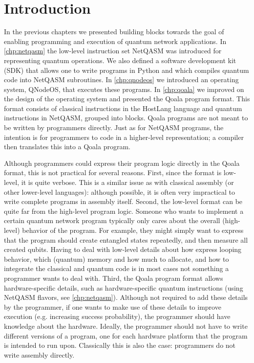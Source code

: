 \section{Introduction}
In the previous chapters we presented building blocks towards the goal of enabling programming and execution of quantum network applications.
In \cref{chp:netqasm} the low-level instruction set NetQASM was introduced for representing quantum operations.
We also defined a software development kit (SDK) that allows one to write programs in Python and which compiles quantum code into NetQASM subroutines.
In \cref{chp:qnodeos} we introduced an operating system, QNodeOS, that executes these programs.
In \cref{chp:qoala} we improved on the design of the operating system and presented the Qoala program format.
This format consists of classical instructions in the HostLang language and quantum instructions in NetQASM, grouped into blocks.
Qoala programs are not meant to be written by programmers directly.
Just as for NetQASM programs, the intention is for programmers to code in a higher-level representation; a compiler then translates this into a Qoala program.

Although programmers could express their program logic directly in the Qoala format, this is not practical for several reasons.
First, since the format is low-level, it is quite verbose.
This is a similar issue as with classical assembly (or other lower-level languages): although possible, it is often very impractical to write complete programs in assembly itself.
Second, the low-level format can be quite far from the high-level program logic.
Someone who wants to implement a certain quantum network program typically only cares about the overall (high-level) behavior of the program.
For example, they might simply want to express that the program should create entangled states repeatedly, and then measure all created qubits.
Having to deal with low-level details about how express looping behavior, which (quantum) memory and how much to allocate, and how to integerate the classical and quantum code
is in most cases not something a programmer wants to deal with. 
Third, the Qoala program format allows hardware-specific details, such as hardware-specific quantum instructions (using NetQASM flavors, see \cref{chp:netqasm}).
Although not required to add these details by the programmer, if one wants to make use of these details to improve execution (e.g. increasing success probability), the programmer should have knowledge about the hardware.
Ideally, the programmer should not have to write different versions of a program, one for each hardware platform that the program is intended to run upon.
Classically this is also the case: programmers do not write assembly directly.

